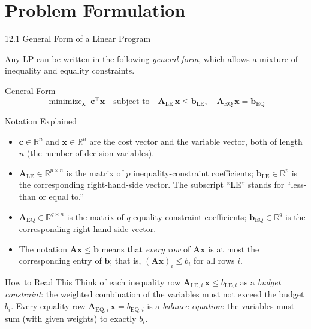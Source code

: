 \documentclass[aspectratio=169,10pt]{beamer}
\DeclareMathOperator*{\minimize}{minimize}
\newcommand{\xv}{\mathbf{x}}
\newcommand{\cv}{\mathbf{c}}
\newcommand{\bv}{\mathbf{b}}
\newcommand{\Av}{\mathbf{A}}
\begin{document}
\section{Problem Formulation}

\begin{frame}[allowframebreaks]{12.1 General Form of a Linear Program}

Any LP can be written in the following \emph{general form}, which allows a mixture of
inequality and equality constraints.

\begin{block}{General Form}
\[
  \minimize_{\xv}\;\cv^\top\xv
  \quad\text{subject to}\quad
  \Av_{\mathrm{LE}}\,\xv \le \bv_{\mathrm{LE}},\quad
  \Av_{\mathrm{EQ}}\,\xv = \bv_{\mathrm{EQ}}
\]
\end{block}

\begin{block}{Notation Explained}
\begin{itemize}
  \item $\cv \in \mathbb{R}^n$ and $\xv \in \mathbb{R}^n$ are the cost vector and the
        variable vector, both of length $n$ (the number of decision variables).
  \item $\Av_{\mathrm{LE}} \in \mathbb{R}^{p \times n}$ is the matrix of $p$
        inequality-constraint coefficients; $\bv_{\mathrm{LE}} \in \mathbb{R}^p$ is the
        corresponding right-hand-side vector.  The subscript ``LE'' stands for
        ``less-than or equal to.''
  \item $\Av_{\mathrm{EQ}} \in \mathbb{R}^{q \times n}$ is the matrix of $q$
        equality-constraint coefficients; $\bv_{\mathrm{EQ}} \in \mathbb{R}^q$ is the
        corresponding right-hand-side vector.
  \item The notation $\Av\xv \le \bv$ means that \emph{every row} of $\Av\xv$ is
        at most the corresponding entry of $\bv$; that is, $(\Av\xv)_i \le b_i$ for
        all rows $i$.
\end{itemize}
\end{block}

\begin{alertblock}{How to Read This}
Think of each inequality row $\Av_{\mathrm{LE}, i}\,\xv \le b_{\mathrm{LE}, i}$ as a
\emph{budget constraint}: the weighted combination of the variables must not exceed the
budget $b_i$.  Every equality row $\Av_{\mathrm{EQ}, i}\,\xv = b_{\mathrm{EQ}, i}$
is a \emph{balance equation}: the variables must sum (with given weights) to exactly $b_i$.
\end{alertblock}


\end{frame}
\end{document}
